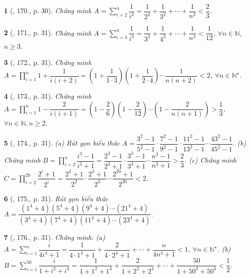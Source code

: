 \documentclass{article}
\newtheorem{baitoan}{}
\begin{document}
\begin{baitoan}[\cite{Binh_Toan_8_tap_1}, 170., p. 30]
	Chứng minh $A = \sum_{i=2}^n \dfrac{1}{i^2} = \dfrac{1}{2^2} + \dfrac{1}{3^2} + \cdots + \dfrac{1}{n^2} < \dfrac{2}{3}$.
\end{baitoan}

\begin{baitoan}[\cite{Binh_Toan_8_tap_1}, 171., p. 31]
	Chứng minh $A = \sum_{i=3}^n \dfrac{1}{i^3} = \dfrac{1}{3^3} + \dfrac{1}{4^3} + \cdots + \dfrac{1}{n^3} < \dfrac{1}{12}$, $\forall n\in\mathbb{N}$, $n\ge3$.
\end{baitoan}

\begin{baitoan}[\cite{Binh_Toan_8_tap_1}, 172., p. 31]
	Chứng minh $A = \prod_{i=1}^n 1 + \dfrac{1}{i(i + 2)} = \left(1 + \dfrac{1}{1\cdot3}\right)\left(1 + \dfrac{1}{2\cdot4}\right)\cdots\dfrac{1}{n(n + 2)} < 2$, $\forall n\in\mathbb{N}^\star$.
\end{baitoan}

\begin{baitoan}[\cite{Binh_Toan_8_tap_1}, 173., p. 31]
	Chứng minh $A = \prod_{i=1}^n 1 - \dfrac{2}{i(i + 1)} = \left(1 - \dfrac{2}{6}\right)\left(1 - \dfrac{2}{12}\right)\cdots\left(1 - \dfrac{2}{n(n + 1)}\right) > \dfrac{1}{3}$, $\forall n\in\mathbb{N},n\ge2$.
\end{baitoan}

\begin{baitoan}[\cite{Binh_Toan_8_tap_1}, 174., p. 31]
	(a) Rút gọn biểu thức $A = \dfrac{3^2 - 1}{5^2 - 1}\cdot\dfrac{7^2 - 1}{9^2 - 1}\cdot\dfrac{11^2 - 1}{13^2 - 1}\cdots\dfrac{43^2 - 1}{45^2 - 1}$. (b) Chứng minh $B = \prod_{i=2}^n \dfrac{i^3 - 1}{i^3 + 1} = \dfrac{2^3 - 1}{2^3 + 1}\cdot\dfrac{3^3 - 1}{3^3 + 1}\cdots\dfrac{n^3 - 1}{n^3 + 1} > \dfrac{2}{3}$. (c) Chứng minh $C = \prod_{i=2}^{20} \dfrac{2^i + 1}{2^i} = \dfrac{2^2 + 1}{2^2}\cdot\dfrac{2^3 + 1}{2^3}\cdots\dfrac{2^{20} + 1}{2^{20}} < 2$.
\end{baitoan}

\begin{baitoan}[\cite{Binh_Toan_8_tap_1}, 175., p. 31]
	Rút gọn biểu thức $A = \dfrac{(1^4 + 4)(5^4 + 4)(9^4 + 4)\cdots(21^4 + 4)}{(3^4 + 4)(7^4 + 4)(11^4 + 4)\cdots(23^4 + 4)}$.
\end{baitoan}

\begin{baitoan}[\cite{Binh_Toan_8_tap_1}, 176., p. 31]
	Chứng minh: (a) $A = \sum_{i=1}^n \dfrac{i}{4i^4 + 1} = \dfrac{1}{4\cdot1^4 + 1} + \dfrac{2}{4\cdot2^4 + 1} + \cdots + \dfrac{n}{4n^4 + 1} < 1$, $\forall n\in\mathbb{N}^\star$. (b) $B = \sum_{i=1}^{50} \dfrac{i}{1 + i^2 + i^4} = \dfrac{1}{1 + 1^2 + 1^4} + \dfrac{2}{1 + 2^2 + 2^4} + \cdots + \dfrac{50}{1 + 50^2 + 50^4} < \dfrac{1}{2}$.
\end{baitoan}
\end{document}
